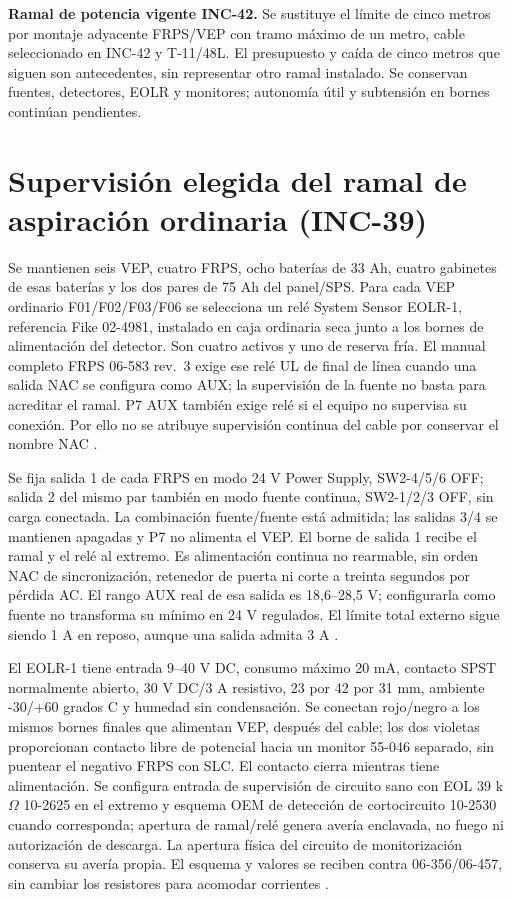 \textbf{Ramal de potencia vigente INC-42.} Se sustituye el límite de cinco metros por montaje adyacente FRPS/VEP con tramo máximo de un metro, cable seleccionado en INC-42 y T-11/48L. El presupuesto y caída de cinco metros que siguen son antecedentes, sin representar otro ramal instalado. Se conservan fuentes, detectores, EOLR y monitores; autonomía útil y subtensión en bornes continúan pendientes.

\section{Supervisión elegida del ramal de aspiración ordinaria (INC-39)}
\label{sec:sd4-inc39}
Se mantienen seis VEP, cuatro FRPS, ocho baterías de 33 Ah, cuatro gabinetes de esas baterías y los dos pares de 75 Ah del panel/SPS. Para cada VEP ordinario F01/F02/F03/F06 se selecciona un relé System Sensor EOLR-1, referencia Fike 02-4981, instalado en caja ordinaria seca junto a los bornes de alimentación del detector. Son cuatro activos y uno de reserva fría. El manual completo FRPS 06-583 rev.~3 exige ese relé UL de final de línea cuando una salida NAC se configura como AUX; la supervisión de la fuente no basta para acreditar el ramal. P7 AUX también exige relé si el equipo no supervisa su conexión. Por ello no se atribuye supervisión continua del cable por conservar el nombre NAC \parencite[secs.~2.5.6.2 y 2.5.8, pp.~19/21]{lote39-frpsmanual}.

Se fija salida 1 de cada FRPS en modo 24 V Power Supply, SW2-4/5/6 OFF; salida 2 del mismo par también en modo fuente continua, SW2-1/2/3 OFF, sin carga conectada. La combinación fuente/fuente está admitida; las salidas 3/4 se mantienen apagadas y P7 no alimenta el VEP. El borne de salida 1 recibe el ramal y el relé al extremo. Es alimentación continua no rearmable, sin orden NAC de sincronización, retenedor de puerta ni corte a treinta segundos por pérdida AC. El rango AUX real de esa salida es 18,6--28,5 V; configurarla como fuente no transforma su mínimo en 24 V regulados. El límite total externo sigue siendo 1 A en reposo, aunque una salida admita 3 A \parencite[secs.~1.3, 3.1 y 3.1.2, pp.~9--10/22--24]{lote39-frpsmanual}.

El EOLR-1 tiene entrada 9--40 V DC, consumo máximo 20 mA, contacto SPST normalmente abierto, 30 V DC/3 A resistivo, 23 por 42 por 31 mm, ambiente -30/+60 grados C y humedad sin condensación. Se conectan rojo/negro a los mismos bornes finales que alimentan VEP, después del cable; los dos violetas proporcionan contacto libre de potencial hacia un monitor 55-046 separado, sin puentear el negativo FRPS con SLC. El contacto cierra mientras tiene alimentación. Se configura entrada de supervisión de circuito sano con EOL 39 k$\Omega$ 10-2625 en el extremo y esquema OEM de detección de cortocircuito 10-2530 cuando corresponda; apertura de ramal/relé genera avería enclavada, no fuego ni autorización de descarga. La apertura física del circuito de monitorización conserva su avería propia. El esquema y valores se reciben contra 06-356/06-457, sin cambiar los resistores para acomodar corrientes \parencite{lote39-eolr1}\parencite[sec.~3.9.2 y ap.~C]{lote33-cheetah11}.

